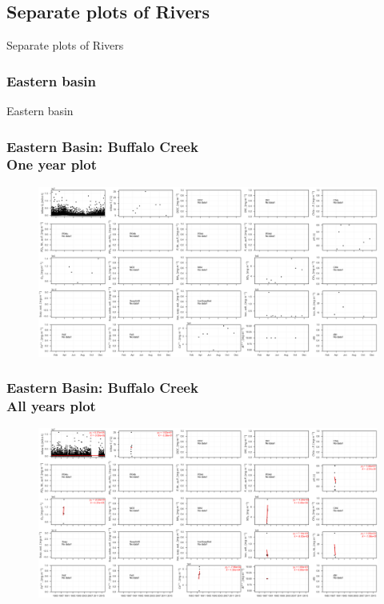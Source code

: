 \documentclass{beamer}
\begin{document}
\subsection{Separate plots of Rivers}

\begin{frame}
\begin{center}
\Huge Separate plots of Rivers
\end{center}
\end{frame}


\subsubsection{Eastern basin}

\begin{frame}
\begin{center}
\Huge Eastern basin
\end{center}
\end{frame}


\begin{frame}
\frametitle{Eastern Basin: Buffalo Creek\\ One year plot}
\begin{figure}
\includegraphics[width=\textwidth]{rivers/Eastern basin/plot_1yr buffalocreek.png}
\end{figure}
\end{frame}

\begin{frame}
\frametitle{Eastern Basin: Buffalo Creek\\ All years plot}
\begin{figure}
\includegraphics[width=\textwidth]{rivers/Eastern basin/plot_all buffalocreek.png}
\end{figure}
\end{frame}
\end{document}
